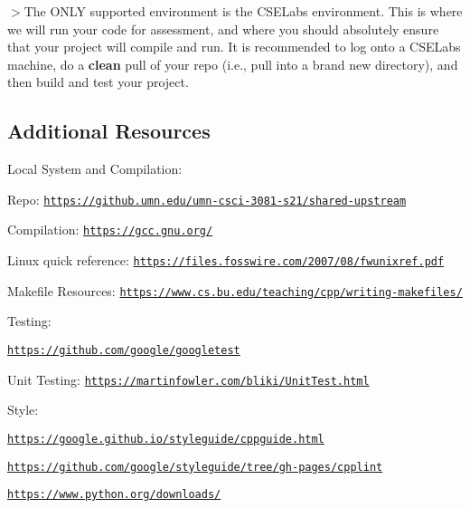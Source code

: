 $>$The O\+N\+LY supported environment is the C\+S\+E\+Labs environment. This is where we will run your code for assessment, and where you should absolutely ensure that your project will compile and run. It is recommended to log onto a C\+S\+E\+Labs machine, do a {\bfseries clean} pull of your repo (i.\+e., pull into a brand new directory), and then build and test your project.





\subsection*{Additional Resources}

Local System and Compilation\+:
\begin{DoxyItemize}
\item Repo\+: \href{https://github.umn.edu/umn-csci-3081-s21/shared-upstream}{\tt https\+://github.\+umn.\+edu/umn-\/csci-\/3081-\/s21/shared-\/upstream}
\item Compilation\+: \href{https://gcc.gnu.org/}{\tt https\+://gcc.\+gnu.\+org/}
\item Linux quick reference\+: \href{https://files.fosswire.com/2007/08/fwunixref.pdf}{\tt https\+://files.\+fosswire.\+com/2007/08/fwunixref.\+pdf}
\item Makefile Resources\+: \href{https://www.cs.bu.edu/teaching/cpp/writing-makefiles/}{\tt https\+://www.\+cs.\+bu.\+edu/teaching/cpp/writing-\/makefiles/}
\end{DoxyItemize}

Testing\+:
\begin{DoxyItemize}
\item \href{https://github.com/google/googletest}{\tt https\+://github.\+com/google/googletest}
\item Unit Testing\+: \href{https://martinfowler.com/bliki/UnitTest.html}{\tt https\+://martinfowler.\+com/bliki/\+Unit\+Test.\+html}
\end{DoxyItemize}

Style\+:
\begin{DoxyItemize}
\item \href{https://google.github.io/styleguide/cppguide.html}{\tt https\+://google.\+github.\+io/styleguide/cppguide.\+html}
\item \href{https://github.com/google/styleguide/tree/gh-pages/cpplint}{\tt https\+://github.\+com/google/styleguide/tree/gh-\/pages/cpplint}
\item \href{https://www.python.org/downloads/}{\tt https\+://www.\+python.\+org/downloads/}
\end{DoxyItemize}

